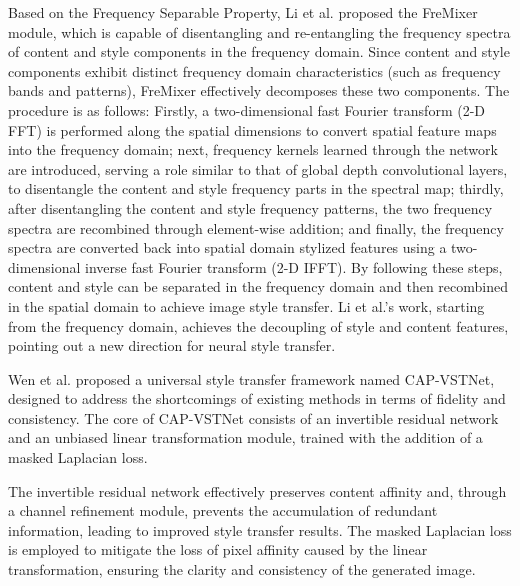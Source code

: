 \documentclass[preprint,12pt]{elsarticle}
\begin{document}
Based on the Frequency Separable Property, Li et al. proposed the FreMixer module, which is capable of disentangling and re-entangling the frequency spectra of content and style components in the frequency domain. Since content and style components exhibit distinct frequency domain characteristics (such as frequency bands and patterns), FreMixer effectively decomposes these two components. The procedure is as follows: Firstly, a two-dimensional fast Fourier transform (2-D FFT) is performed along the spatial dimensions to convert spatial feature maps into the frequency domain; next, frequency kernels learned through the network are introduced, serving a role similar to that of global depth convolutional layers, to disentangle the content and style frequency parts in the spectral map; thirdly, after disentangling the content and style frequency patterns, the two frequency spectra are recombined through element-wise addition; and finally, the frequency spectra are converted back into spatial domain stylized features using a two-dimensional inverse fast Fourier transform (2-D IFFT). By following these steps, content and style can be separated in the frequency domain and then recombined in the spatial domain to achieve image style transfer. Li et al.'s work\citep{03li2023frequency}, starting from the frequency domain, achieves the decoupling of style and content features, pointing out a new direction for neural style transfer.

Wen et al.\citep{118wen2023cap} proposed a universal style transfer framework named CAP-VSTNet, designed to address the shortcomings of existing methods in terms of fidelity and consistency. The core of CAP-VSTNet consists of an invertible residual network and an unbiased linear transformation module, trained with the addition of a masked Laplacian loss.

The invertible residual network effectively preserves content affinity and, through a channel refinement module, prevents the accumulation of redundant information, leading to improved style transfer results. The masked Laplacian loss is employed to mitigate the loss of pixel affinity caused by the linear transformation, ensuring the clarity and consistency of the generated image.
\end{document}
